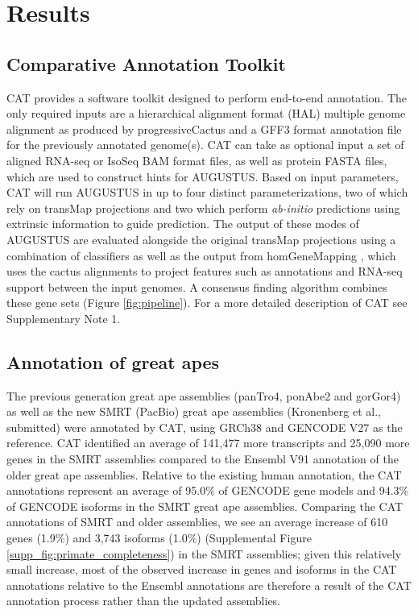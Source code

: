 \documentclass[fleqn,10pt]{wlscirep}
\begin{document}
\section*{Results}

\subsection*{Comparative Annotation Toolkit}

CAT provides a software toolkit designed to perform end-to-end annotation. The only required inputs are a hierarchical alignment format (HAL) \cite{hickey2013hal} multiple genome alignment as produced by progressiveCactus and a GFF3 format annotation file for the previously annotated genome(s). CAT can take as optional input a set of aligned RNA-seq or IsoSeq BAM format files, as well as protein FASTA files, which are used to construct hints for AUGUSTUS. Based on input parameters, CAT will run AUGUSTUS in up to four distinct parameterizations, two of which rely on transMap projections and two which perform \textit{ab-initio} predictions using extrinsic information to guide prediction. The output of these modes of AUGUSTUS are evaluated alongside the original transMap projections using a combination of classifiers as well as the output from homGeneMapping \cite{stanke2004augustus}, which uses the cactus alignments to project features such as annotations and RNA-seq support between the input genomes. A consensus finding algorithm combines these gene sets (Figure \ref{fig:pipeline}). For a more detailed description of CAT see Supplementary Note 1.

\subsection*{Annotation of great apes}

The previous generation great ape assemblies (panTro4, ponAbe2 and gorGor4) as well as the new SMRT (PacBio) great ape assemblies \cite{gordon2016long} (Kronenberg et al., submitted) were annotated by CAT, using GRCh38 and GENCODE V27 as the reference. CAT identified an average of 141,477 more transcripts and 25,090 more genes in the SMRT assemblies compared to the Ensembl V91 annotation of the older great ape assemblies. Relative to the existing human annotation, the CAT annotations represent an average of 95.0\% of GENCODE gene models and 94.3\% of GENCODE isoforms in the SMRT great ape assemblies. Comparing the CAT annotations of SMRT and older assemblies, we see an average increase of 610 genes (1.9\%) and 3,743 isoforms (1.0\%) (Supplemental Figure \ref{supp_fig:primate_completeness}) in the SMRT assemblies; given this relatively small increase, most of the observed increase in genes and isoforms in the CAT annotations relative to the Ensembl annotations are therefore a result of the CAT annotation process rather than the updated assemblies.
\end{document}
